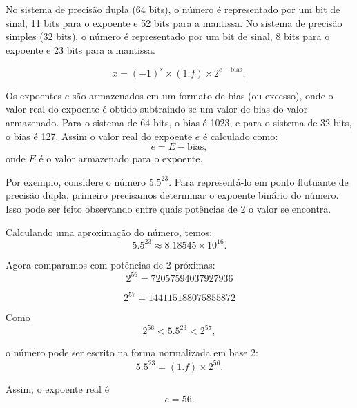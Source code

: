 No sistema de precisão dupla (64 bits), o número é representado por um bit de
sinal, 11 bits para o expoente e 52 bits para a mantissa. No sistema de
precisão simples (32 bits), o número é representado por um bit de sinal, 8 bits
para o expoente e 23 bits para a mantissa.

\begin{equation}
  x = (-1)^s \times (1.\textit{f}) \times 2^{e - \text{bias}},
\end{equation}

Os expoentes $e$ são armazenados em um formato de bias (ou excesso), onde o
valor real do expoente é obtido subtraindo-se um valor de bias do valor
armazenado. Para o sistema de 64 bits, o bias é 1023, e para o sistema de 32
bits, o bias é 127. Assim o valor real do expoente $e$ é calculado como:
\begin{equation}
  e = E - \text{bias},
  \label{eq:expoente}
\end{equation}
onde $E$ é o valor armazenado para o expoente.

Por exemplo, considere o número $5.5^{23}$. Para representá-lo em ponto
flutuante de precisão dupla, primeiro precisamos determinar o expoente binário
do número. Isso pode ser feito observando entre quais potências de 2 o valor se
encontra.

Calculando uma aproximação do número, temos:
\begin{equation}
  5.5^{23} \approx 8.18545 \times 10^{16}.
\end{equation}

Agora comparamos com potências de 2 próximas:
\begin{equation}
  2^{56} = 72057594037927936
\end{equation}

\begin{equation}
  2^{57} = 144115188075855872
\end{equation}

Como
\begin{equation}
  2^{56} < 5.5^{23} < 2^{57},
\end{equation}

o número pode ser escrito na forma normalizada em base 2:
\begin{equation}
  5.5^{23} = (1.f) \times 2^{56}.
\end{equation}

Assim, o expoente real é
\begin{equation}
  e = 56.
\end{equation}


